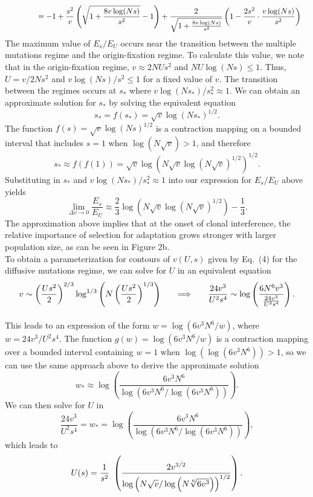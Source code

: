 \documentclass[11pt,onecolumn]{article}
\begin{document}
\[
\begin{aligned}
\hspace{.55in} & = -1+\frac{s^2}{v} \left( \sqrt{1+\frac{8v\log(Ns)}{s^2}}-1\right) + \frac{2}{\sqrt{1+\frac{8v\log(Ns)}{s^2}}} \left(1-\frac{2s^2}{v}\cdot\frac{v\log(Ns)}{s^2}\right)
\end{aligned}
\]
The maximum value of $E_s/E_U$ occurs near the transition between the multiple mutations regime and the origin-fixation regime. To calculate this value, we note that in the origin-fixation regime, $v \approx 2NUs^2$ and $NU\log(Ns)\leq 1$. Thus, $U=v/2Ns^2$ and $v\log(Ns)/s^2 \leq 1$ for a fixed value of $v$. The transition between the regimes occurs at $s_*$ where $v\log(Ns_*)/s_*^2 \approx 1$. We can obtain an approximate solution for $s_*$ by solving the equivalent equation
\[
s_*=f(s_*) = \sqrt{v}\log(Ns_*)^{1/2}.
\]
The function $f(s)=\sqrt{v}\log(Ns)^{1/2}$ is a contraction mapping on a bounded interval that includes $s=1$ when $\log(N\sqrt{v})> 1$, and therefore 
\[
s_*\approx f(f(1))= \sqrt{v}\log(N\sqrt{v}\log(N\sqrt{v})^{1/2})^{1/2}.
\]
Substituting in $s_*$ and $v\log(Ns_*)/s_*^2 \approx 1$ into our expression for $E_s/E_U$ above yields
\begin{equation}\label{eq:supp:EsEuMM}
\lim_{\Delta v\rightarrow 0}\frac{E_s}{E_U} \approx \frac{2}{3}\log(N\sqrt{v}\log(N\sqrt{v})^{1/2})-\frac{1}{3}.
\end{equation}
The approximation above implies that at the onset of clonal interference, the relative importance of selection for adaptation grows stronger with larger population size, as can be seen in Figure 2b.\\

To obtain a parameterization for contours of $v(U,s)$ given by Eq.~(4) for the diffusive mutations regime, we can solve for $U$ in an equivalent equation
\[
\begin{aligned}
v\sim \left(\frac{Us^2}{2}\right)^{2/3} \log^{1/3}\left( N \left(\frac{Us^2}{2}\right)^{1/3} \right) \hspace{.2in}& \implies \hspace{.2in} \frac{24v^3}{U^2s^4} \sim  \log \left( \frac{6N^6 v^3 }{\frac{24v^3}{U^2s^4}} \right).\\[3mm]
\end{aligned}
\]
This leads to an expression of the form $w= \log\left(6v^3N^6/{w}\right)$,
where $w = 24v^3/U^2s^4$. The function $g(w)=\log\left(6v^3N^6/{w}\right)$ is a contraction mapping over a bounded interval containing $w=1$ when $\log(\log(6v^3N^6))>1$, so we can use the same approach above to derive the approximate solution
\[
w_* \approx \log \left( \frac{6v^3N^6}{\log (6v^3N^6/\log (6v^3N^6))} \right).
\]
We can then solve for $U$ in
\[
\frac{24v^3}{U^2s^4} = w_* = \log \left( \frac{6v^3N^6}{\log (6v^3N^6/\log (6v^3N^6))} \right),
\]
which leads to 
\begin{equation} \label{eq:app:UparamHallatschek}
    U(s) = \frac{1}{s^2}\hspace{.05in}\left ( \frac{2v^{3/2}}{\log \left(N \sqrt{v}/\log \left(N\sqrt[6]{6v^3}\right)\right)^{1/2}} \right).
\end{equation}
 
\end{document}
